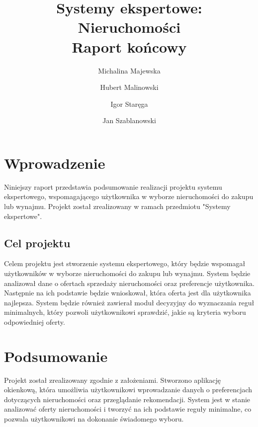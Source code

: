 \documentclass{article}
\title{Systemy ekspertowe: Nieruchomości \\ \large{Raport końcowy}}
\author{Michalina Majewska
	\and Hubert Malinowski
	\and Igor Staręga
	\and Jan Szablanowski}
\begin{document}
\maketitle
\tableofcontents

\vspace{2cm}
\newpage

\section{Wprowadzenie}

Niniejszy raport przedstawia podsumowanie realizacji projektu systemu ekspertowego, wspomagającego użytkownika w wyborze nieruchomości do zakupu lub wynajmu. Projekt został zrealizowany w ramach przedmiotu "Systemy ekspertowe".

\subsection{Cel projektu}

Celem projektu jest stworzenie systemu ekspertowego, który będzie wspomagał użytkowników w wyborze nieruchomości do zakupu lub wynajmu. System będzie analizował dane o ofertach sprzedaży nieruchomości oraz preferencje użytkownika. Następnie na ich podstawie będzie wnioskował, która oferta jest dla użytkownika najlepsza. System będzie również zawierał moduł decyzyjny do wyznaczania reguł minimalnych, który pozwoli użytkownikowi sprawdzić, jakie są kryteria wyboru odpowiedniej oferty.






\section{Podsumowanie}
Projekt został zrealizowany zgodnie z założeniami. Stworzono aplikację okienkową, która umożliwia użytkownikowi wprowadzanie danych o preferencjach dotyczących nieruchomości oraz przeglądanie rekomendacji. System jest w stanie analizować oferty nieruchomości i tworzyć na ich podstawie reguły minimalne, co pozwala użytkownikowi na dokonanie świadomego wyboru.
\end{document}
